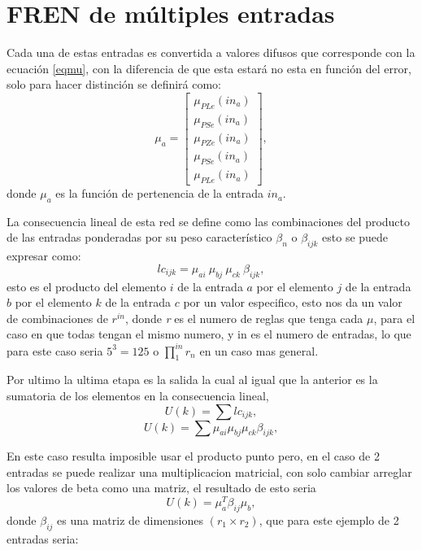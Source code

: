     
    \section{FREN de múltiples entradas}
    Cada una de estas entradas es convertida a valores difusos que corresponde con la ecuación \ref{eqmu}, con la diferencia de que esta estará no esta en función del error, solo para hacer distinción se definirá como:
    \begin{equation}
    \label{eqmmu}
    \mu_a=\begin{bmatrix}
    	\mu_{PLe}(in_a) \\ 
    	\mu_{PSe}(in_a)\\ 
    	\mu_{PZe}(in_a)\\ 
    	\mu_{PSe}(in_a)\\ 
    	\mu_{PLe}(in_a)
    \end{bmatrix}  ,
\end{equation}
    donde $\mu_a$ es la función de pertenencia de la entrada $in_a$.
    
    La consecuencia lineal de esta red se define como las combinaciones del producto de las entradas ponderadas por su peso característico $\beta_n$ o $\beta_{ijk}$
    esto se puede expresar como: \begin{equation}
    lc_{ijk}=\mu_{ai}\ \mu_{bj} \ \mu_{ck} \ \beta_{ijk},
    \end{equation}
    esto es el producto del elemento $i$ de la entrada $a$ por el elemento $j$ de la entrada $b$ por el elemento $k$ de la entrada $c$ por un valor especifico, esto nos da un valor de combinaciones de $r^{in}$, donde \textit{r} es el numero de reglas que tenga cada $\mu$, para el caso en que todas tengan el mismo numero, y in es el numero de entradas, lo que para este caso seria $5^3 = 125$ o $\prod_{1}^{in} r_n$
    en un caso mas general.
    
    Por ultimo la ultima etapa es la salida la cual al igual que la anterior es la sumatoria de los elementos en la consecuencia lineal, \begin{equation}    U(k)= \sum lc_{ijk} ,
    \end{equation}
    \begin{equation}
    U(k)= \sum  \mu_{ai} \mu_{bj} \mu_{ck} \beta_{ijk}  ,
    \end{equation}
    
     En este caso resulta imposible usar el producto punto pero, en el caso de 2 entradas se puede realizar una multiplicacion matricial, con solo cambiar arreglar los valores de beta como una matriz, el resultado de esto seria \begin{equation}
     \label{multu}
     U(k)= \mu_{a}^{T} \beta_{ij} \mu_{b} ,
     \end{equation}  donde $\beta_{ij}$ es una matriz de dimensiones $(r_1 \times r_2)$, que para este ejemplo de 2 entradas seria:
     
